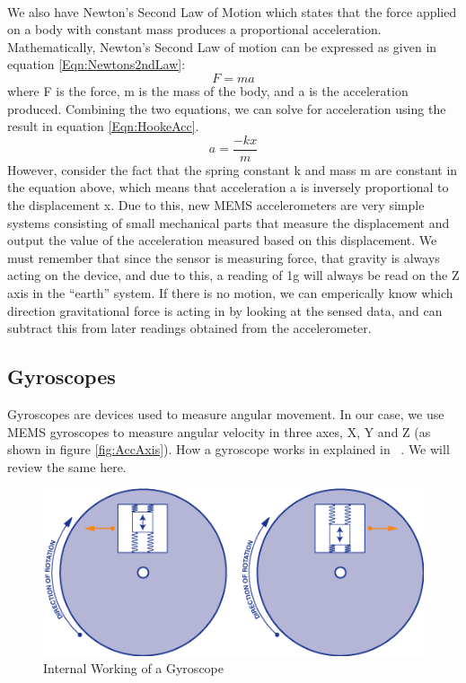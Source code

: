 \hfill \\
We also have Newton's Second Law of Motion
which states that the force applied on a body with constant mass produces a proportional acceleration.
Mathematically, Newton's Second Law of motion can be expressed as given in equation \ref{Eqn:Newtons2ndLaw}:
\begin{equation}
\label{Eqn:Newtons2ndLaw}
F = ma 
\end{equation}
where F is the force, m is the mass of the body, and a is the acceleration produced. Combining the two equations, we can solve for acceleration using the result in equation \ref{Eqn:HookeAcc}.
\begin{equation}
\label{Eqn:HookeAcc}
a = \frac{-kx}{m} 
\end{equation}
However, consider the fact that the spring constant k and mass m are constant in the equation above, which means that acceleration a is inversely proportional to the displacement x. Due to this, new MEMS accelerometers are very simple systems consisting of small mechanical parts that measure the displacement and output the value of the acceleration measured based on this displacement.
We must remember that since the sensor is measuring force, that gravity is always acting on the device,
and due to this, a reading of 1g will always be read on the Z axis in the ``earth'' system.
If there is no motion, we can emperically know which direction gravitational force is acting in by looking at the sensed data,
and can subtract this from later readings obtained from the accelerometer.

\subsection{Gyroscopes}
\label{Sec:Gyroscope}

Gyroscopes are devices used to measure angular movement. In our case, we use MEMS gyroscopes to measure angular velocity in three axes, X, Y and Z (as shown in figure \ref{fig:AccAxis}). How a gyroscope works in explained in ~\cite{Web:SparkfunGyros}. We will review the same here.
\begin{figure}
\begin{center}
\includegraphics{images/GyroWork.png}
\caption{Internal Working of a Gyroscope}
\label{fig:GyroDiag}
\end{center}
\end{figure}

